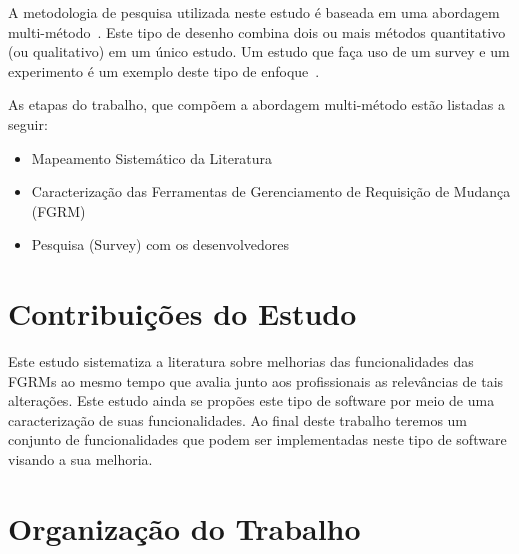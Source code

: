 A metodologia de pesquisa utilizada neste estudo é baseada em uma abordagem
multi-método~\cite{hesse2010mixed}. Este tipo de desenho combina dois ou mais
métodos quantitativo (ou qualitativo) em um único estudo. Um estudo que faça uso
de um survey e um experimento é um exemplo deste tipo de
enfoque~\cite{hesse2010mixed}.


As etapas do trabalho, que compõem a abordagem multi-método estão listadas a
seguir:

\begin{itemize}[(i)]
	\item Mapeamento Sistemático da Literatura~\cite{Petersen2008}
	\item Caracterização das Ferramentas de Gerenciamento de Requisição de
		Mudança (FGRM)
	\item Pesquisa (Survey) com os
		desenvolvedores~\cite{wohlin2012experimentation}
\end{itemize}

\section{Contribuições do Estudo}
\label{sec:intro-contribuicao}

Este estudo sistematiza a literatura sobre melhorias das funcionalidades das
FGRMs ao mesmo tempo que avalia junto aos profissionais as relevâncias de tais
alterações. Este estudo ainda se propões este tipo de software por meio de uma
caracterização de suas funcionalidades. Ao final deste trabalho teremos um
conjunto de funcionalidades que podem ser implementadas neste tipo de software
visando a sua melhoria.

\section{Organização do Trabalho}
\label{sec:intro-organizacao-dissertacao}

\todoend{}
